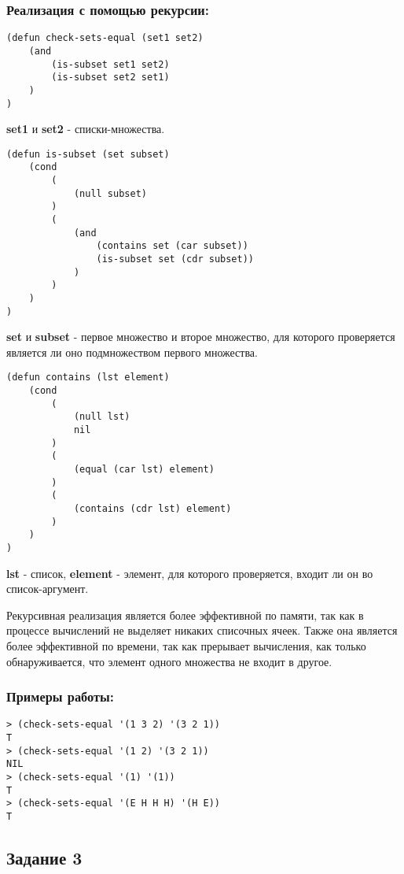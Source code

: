 \documentclass[a4paper,12pt]{article}
\begin{document}
\subsubsection*{Реализация с помощью рекурсии:}
\begin{lstlisting}[caption=Функция проверки эквивалентности двух множеств]
(defun check-sets-equal (set1 set2)
	(and
		(is-subset set1 set2)
		(is-subset set2 set1)
	)
)
\end{lstlisting}
\textbf{set1} и \textbf{set2} - списки-множества.
\begin{lstlisting}[caption=Функция проверки вхождения подмножества во множество]
(defun is-subset (set subset)
	(cond
		(
			(null subset)
		)
		(
			(and 
				(contains set (car subset))
				(is-subset set (cdr subset))
			)
		)
	)
)
\end{lstlisting}
\textbf{set} и \textbf{subset} - первое множество и второе множество, для которого проверяется является ли оно подмножеством первого множества.

\newpage

\begin{lstlisting}[caption=Функция проверки вхождения элемента в список]
(defun contains (lst element)
	(cond
		(
			(null lst)
			nil
		)
		(
			(equal (car lst) element)
		)
		(
			(contains (cdr lst) element)
		)
	)
)
\end{lstlisting}
\textbf{lst} - список,  \textbf{element} - элемент, для которого проверяется, входит ли он во  список-аргумент.

Рекурсивная реализация является более эффективной по памяти, так как в процессе вычислений не выделяет никаких списочных ячеек. Также она является более эффективной по времени, так как прерывает вычисления, как только обнаруживается, что элемент одного множества не входит в другое.

\subsubsection*{Примеры работы:}
\begin{lstlisting}
> (check-sets-equal '(1 3 2) '(3 2 1))
T
> (check-sets-equal '(1 2) '(3 2 1))
NIL
> (check-sets-equal '(1) '(1))
T
> (check-sets-equal '(E H H H) '(H E))
T
\end{lstlisting}

\subsection*{Задание 3}
\end{document}
